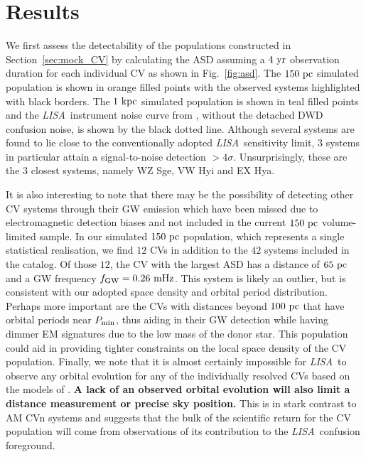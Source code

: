 \documentclass[fleqn,usenatbib]{mnras}
\newcommand{\lisa}{{\it LISA}}
\begin{document}
\section{Results}
We first assess the detectability of the populations constructed in Section~\ref{sec:mock_CV} by calculating the ASD assuming a $4~\rm{yr}$ observation duration for each individual CV as shown in Fig.~\ref{fig:asd}. The $150~\rm{pc}$ simulated population is shown in orange filled points with the observed \citet{pala20} systems highlighted with black borders. The $1~\rm{kpc}$ simulated population is shown in teal filled points and the \lisa\ instrument noise curve from \citet{Robson2019}, without the detached DWD confusion noise, is shown by the black dotted line. Although several systems are found to lie close to the conventionally adopted \lisa\ sensitivity limit, 3 systems in particular attain a signal-to-noise detection $>4\sigma$. Unsurprisingly, these are the 3 closest systems, namely WZ Sge, VW Hyi and EX Hya. 

It is also interesting to note that there may be the possibility of detecting other CV systems through their GW emission which have been missed due to electromagnetic detection biases and not included in the current $150~\rm{pc}$ volume-limited sample. In our simulated $150~\rm{pc}$ population, which represents a single statistical realisation, we find $12$ CVs in addition to the $42$ systems included in the \citet{pala20} catalog. Of those $12$, the CV with the largest ASD has a distance of $65~\rm{pc}$ and a GW frequency $f_{\rm{GW}} = 0.26~\rm{mHz}$. This system is likely an outlier, but is consistent with our adopted space density and orbital period distribution. Perhaps more important are the CVs with distances beyond $100~\rm{pc}$ that have orbital periods near $P_{\rm{min}}$, thus aiding in their GW detection while having dimmer EM signatures due to the low mass of the donor star. This population could aid in providing tighter constraints on the local space density of the CV population. Finally, we note that it is almost certainly impossible for \lisa\ to observe any orbital evolution for any of the individually resolved CVs based on the models of \citet{knigge11}. \textbf{A lack of an observed orbital evolution will also limit a distance measurement or precise sky position.} This is in stark contrast to AM CVn systems \citep[e.g.][]{Nelemans2004, Kremer2017, Breivik2018} and suggests that the bulk of the scientific return for the CV population will come from observations of its contribution to the \lisa\ confusion foreground. 
\end{document}
